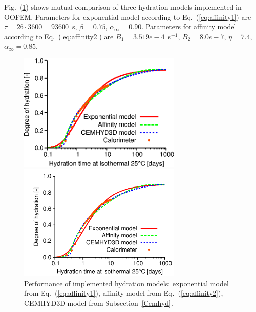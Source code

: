 \documentclass[a4paper]{article}
\newcommand{\refeq}[1]{Eq.~(\ref{#1})}
\newcommand{\reffig}[1]{Fig.~(\ref{#1})}
\begin{document}
\reffig{hydration_comparison} shows mutual comparison of three hydration models implemented in OOFEM. Parameters for exponential model according to \refeq{eq:affinity1} are $\tau=26\cdot3600=93600$~s, $\beta=0.75$, $\alpha_\infty=0.90$. Parameters for affinity model according to \refeq{eq:affinity2} are $B_1=3.519e-4$~s$^{-1}$, $B_2=8.0e-7$, $\eta=7.4$, $\alpha_\infty=0.85$.

\begin{figure}[!htb]
\begin{htmlonly}
  \centerline{\includegraphics[width=0.7\textwidth]{Mokra_OOFEM_affinity_time.eps}}
\end{htmlonly}
 \centerline{\includegraphics[width=0.7\textwidth]{Mokra_OOFEM_affinity_time}}
  \caption{Performance of implemented hydration models: exponential model from \refeq{eq:affinity1}, affinity model from \refeq{eq:affinity2}, CEMHYD3D model from Subsection~\ref{Cemhyd}.}
  \label{hydration_comparison}
\end{figure}
\end{document}
